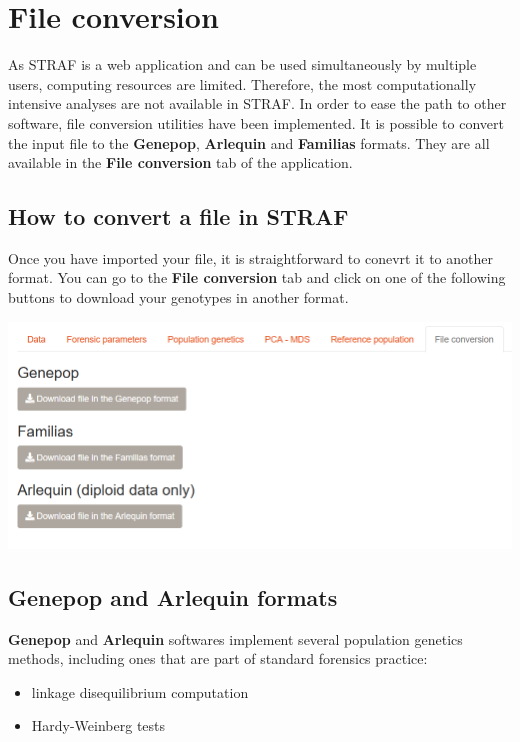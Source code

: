 \documentclass[
]{book}
\begin{document}
\hypertarget{file-conversion}{%
\chapter{File conversion}\label{file-conversion}}

As STRAF is a web application and can be used simultaneously by multiple users,
computing resources are limited. Therefore, the most computationally intensive analyses
are not available in STRAF. In order to ease the path to other software,
file conversion utilities have been implemented. It is possible to convert
the input file to the \textbf{Genepop}, \textbf{Arlequin} and \textbf{Familias} formats. They are
all available in the \textbf{File conversion} tab of the application.

\hypertarget{how-to-convert-a-file-in-straf}{%
\section{How to convert a file in STRAF}\label{how-to-convert-a-file-in-straf}}

Once you have imported your file, it is straightforward to conevrt it to another
format. You can go to the \textbf{File conversion} tab and click on one of the following
buttons to download your genotypes in another format.

\includegraphics[width=0.8\linewidth]{img/capture_file_conversion_1}

\hypertarget{genepop-and-arlequin-formats}{%
\section{Genepop and Arlequin formats}\label{genepop-and-arlequin-formats}}

\textbf{Genepop} and \textbf{Arlequin} softwares implement several population genetics methods,
including ones that are part of standard forensics practice:

\begin{itemize}
\item
  linkage disequilibrium computation
\item
  Hardy-Weinberg tests
\end{itemize}
\end{document}
